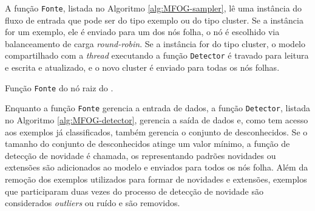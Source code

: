 A função \texttt{Fonte}, listada no Algoritmo \ref{alg:MFOG-sampler}, lê uma
instância do fluxo de entrada que pode ser do tipo exemplo ou do tipo cluster.
Se a instância for um exemplo, ele é enviado para um dos nós folha, o nó é
escolhido via balanceamento de carga \emph{round-robin}.
Se a instância for do tipo cluster, o modelo compartilhado com a \emph{thread}
executando a função \texttt{Detector} é travado para leitura e escrita e
atualizado, e o novo cluster é enviado para todas os nós folhas.

\begin{algorithm}[htb]
    
\caption{Função \texttt{Fonte} do nó raiz do \mfog.}
\label{alg:MFOG-sampler}
\end{algorithm}

Enquanto a função \texttt{Fonte} gerencia a entrada de dados, a função
\texttt{Detector}, listada no Algoritmo \ref{alg:MFOG-detector}, gerencia a saída
de dados e, como tem acesso aos exemplos já classificados, também gerencia o
conjunto de desconhecidos.
Se o tamanho do conjunto de desconhecidos atinge um valor mínimo, a função de
detecção de novidade é chamada, os \mclusters representando padrões novidades ou
extensões são adicionados ao modelo e enviados para todos os nós folha.
Além da remoção dos exemplos utilizados para formar \mclusters de novidades e
extensões, exemplos que participaram duas vezes do processo de detecção de
novidade são considerados \emph{outliers} ou ruído e são removidos.

